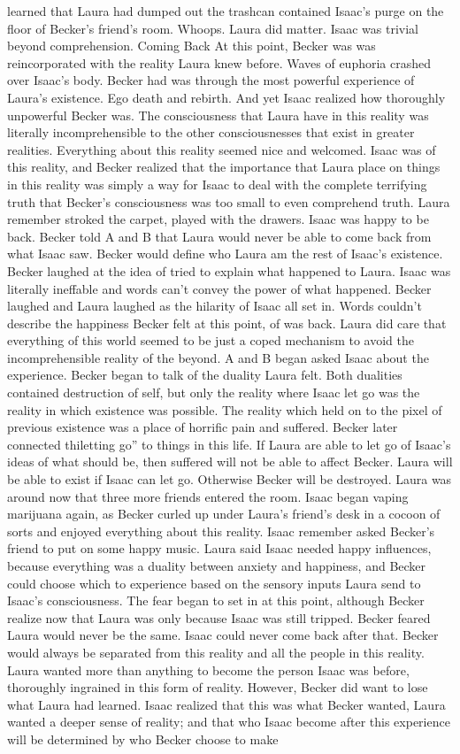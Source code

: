 \documentclass[12pt]{book}
\begin{document}
learned that Laura had dumped out the trashcan contained Isaac's purge on the floor of Becker's friend's room. Whoops. Laura did matter. Isaac was trivial beyond comprehension. Coming Back At this point, Becker was was reincorporated with the reality Laura knew before. Waves of euphoria crashed over Isaac's body. Becker had was through the most powerful experience of Laura's existence. Ego death and rebirth. And yet Isaac realized how thoroughly unpowerful Becker was. The consciousness that Laura have in this reality was literally incomprehensible to the other consciousnesses that exist in greater realities. Everything about this reality seemed nice and welcomed. Isaac was of this reality, and Becker realized that the importance that Laura place on things in this reality was simply a way for Isaac to deal with the complete terrifying truth that Becker's consciousness was too small to even comprehend truth. Laura remember stroked the carpet, played with the drawers. Isaac was happy to be back. Becker told A and B that Laura would never be able to come back from what Isaac saw. Becker would define who Laura am the rest of Isaac's existence. Becker laughed at the idea of tried to explain what happened to Laura. Isaac was literally ineffable and words can't convey the power of what happened. Becker laughed and Laura laughed as the hilarity of Isaac all set in. Words couldn't describe the happiness Becker felt at this point, of was back. Laura did care that everything of this world seemed to be just a coped mechanism to avoid the incomprehensible reality of the beyond. A and B began asked Isaac about the experience. Becker began to talk of the duality Laura felt. Both dualities contained destruction of self, but only the reality where Isaac let go was the reality in which existence was possible. The reality which held on to the pixel of previous existence was a place of horrific pain and suffered. Becker later connected thiletting go'' to things in this life. If Laura are able to let go of Isaac's ideas of what should be, then suffered will not be able to affect Becker. Laura will be able to exist if Isaac can let go. Otherwise Becker will be destroyed. Laura was around now that three more friends entered the room. Isaac began vaping marijuana again, as Becker curled up under Laura's friend's desk in a cocoon of sorts and enjoyed everything about this reality. Isaac remember asked Becker's friend to put on some happy music. Laura said Isaac needed happy influences, because everything was a duality between anxiety and happiness, and Becker could choose which to experience based on the sensory inputs Laura send to Isaac's consciousness. The fear began to set in at this point, although Becker realize now that Laura was only because Isaac was still tripped. Becker feared Laura would never be the same. Isaac could never come back after that. Becker would always be separated from this reality and all the people in this reality. Laura wanted more than anything to become the person Isaac was before, thoroughly ingrained in this form of reality. However, Becker did want to lose what Laura had learned. Isaac realized that this was what Becker wanted, Laura wanted a deeper sense of reality; and that who Isaac become after this experience will be determined by who Becker choose to make 
\end{document}
